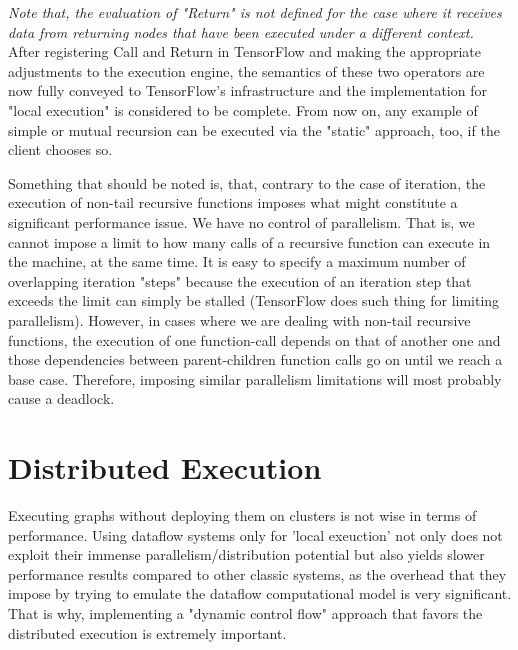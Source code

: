 \documentclass[ack,preface]{dithesis}
\begin{document}
\textit{Note that, the evaluation of "Return" is not defined for the case where it receives data from returning nodes that have been executed under a different context.}\\

After registering Call and Return in TensorFlow and making the appropriate adjustments to the execution engine, the semantics of these two operators are now fully conveyed to TensorFlow's infrastructure and the implementation for "local execution" is considered to be complete. From now on, any example of simple or mutual recursion can be executed via the "static" approach, too, if the client chooses so.

Something that should be noted is, that, contrary to the case of iteration, the execution of non-tail recursive functions imposes what might constitute a significant performance issue.
We have no control of parallelism. That is, we cannot impose a limit to how many calls of a recursive function can execute in the machine, at the same time.
Ιt is easy to specify a maximum number of overlapping iteration "steps"  because the execution of an iteration step that exceeds the limit can simply be stalled (TensorFlow does such thing for limiting parallelism). However, in cases where we are dealing with non-tail recursive functions, the execution of one function-call depends on that of another one and those dependencies between parent-children function calls go on until we reach a base case. Therefore, imposing similar parallelism limitations will most probably cause a deadlock.


    \section{Distributed Execution}

Executing graphs without deploying them on clusters is not wise in terms of performance.  Using dataflow systems only for 'local exeuction' not only does not exploit their immense parallelism/distribution potential but also yields slower performance results compared to other classic systems, as the overhead that they impose by trying to emulate the dataflow computational model is very significant. 
That is why, implementing a "dynamic control flow" approach that favors the distributed execution is extremely important. 
\end{document}
